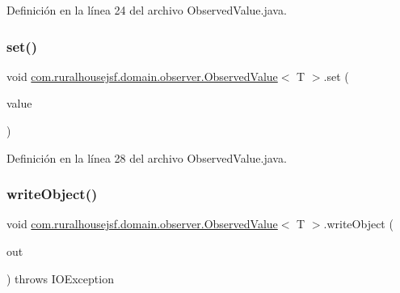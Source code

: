 Definición en la línea 24 del archivo Observed\+Value.\+java.

\mbox{\label{classcom_1_1ruralhousejsf_1_1domain_1_1observer_1_1_observed_value_aaa277755e533e7e85e11640fc98866af}} 
\subsubsection{\texorpdfstring{set()}{set()}\hspace{0.1cm}{\footnotesize\ttfamily [2/2]}}
{\footnotesize\ttfamily void \mbox{\hyperlink{classcom_1_1ruralhousejsf_1_1domain_1_1observer_1_1_observed_value}{com.\+ruralhousejsf.\+domain.\+observer.\+Observed\+Value}}$<$ T $>$.set (\begin{DoxyParamCaption}\item[{Optional$<$ T $>$}]{value }\end{DoxyParamCaption})}



Definición en la línea 28 del archivo Observed\+Value.\+java.

\mbox{\label{classcom_1_1ruralhousejsf_1_1domain_1_1observer_1_1_observed_value_aeb8db23c0310aa0fd0d9bcb2da10fa74}} 
\subsubsection{\texorpdfstring{writeObject()}{writeObject()}}
{\footnotesize\ttfamily void \mbox{\hyperlink{classcom_1_1ruralhousejsf_1_1domain_1_1observer_1_1_observed_value}{com.\+ruralhousejsf.\+domain.\+observer.\+Observed\+Value}}$<$ T $>$.write\+Object (\begin{DoxyParamCaption}\item[{Object\+Output\+Stream}]{out }\end{DoxyParamCaption}) throws I\+O\+Exception\hspace{0.3cm}{\ttfamily [private]}}

